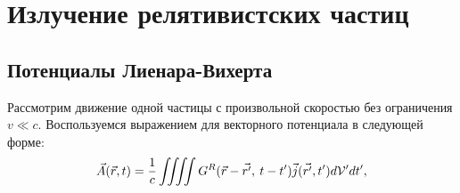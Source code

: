 \newpage
\section{Излучение релятивистских частиц}
\subsection{Потенциалы Лиенара-Вихерта}
    Рассмотрим движение одной частицы с произвольной скоростью без ограничения $v \ll c$. Воспользуемся выражением для векторного потенциала в
    следующей форме:
    \begin{equation}
        \vec{A}(\vec{r}, t) = \frac 1c \iiiint G^R(\vec{r} - \vec{r'}, \: t - t') \vec{j}(\vec{r'}, t')d\mathcal{V}'dt', \label{vec_pot_rel}
    \end{equation}
    
